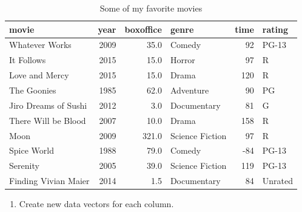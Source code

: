 \documentclass[]{book}
\providecommand{\tightlist}{%
  \setlength{\itemsep}{0pt}\setlength{\parskip}{0pt}}
\theoremstyle{definition}
\theoremstyle{definition}
\theoremstyle{remark}
\begin{document}
\begin{table}

\caption{\label{tab:unnamed-chunk-304}Some of my favorite movies}
\centering
\begin{tabular}[t]{l|r|r|l|r|l}
\hline
movie & year & boxoffice & genre & time & rating\\
\hline
Whatever Works & 2009 & 35.0 & Comedy & 92 & PG-13\\
\hline
It Follows & 2015 & 15.0 & Horror & 97 & R\\
\hline
Love and Mercy & 2015 & 15.0 & Drama & 120 & R\\
\hline
The Goonies & 1985 & 62.0 & Adventure & 90 & PG\\
\hline
Jiro Dreams of Sushi & 2012 & 3.0 & Documentary & 81 & G\\
\hline
There Will be Blood & 2007 & 10.0 & Drama & 158 & R\\
\hline
Moon & 2009 & 321.0 & Science Fiction & 97 & R\\
\hline
Spice World & 1988 & 79.0 & Comedy & -84 & PG-13\\
\hline
Serenity & 2005 & 39.0 & Science Fiction & 119 & PG-13\\
\hline
Finding Vivian Maier & 2014 & 1.5 & Documentary & 84 & Unrated\\
\hline
\end{tabular}
\end{table}

\begin{enumerate}
\def\labelenumi{\arabic{enumi}.}
\setcounter{enumi}{-1}
\tightlist
\item
  Create new data vectors for each column.
\end{enumerate}
\end{document}
